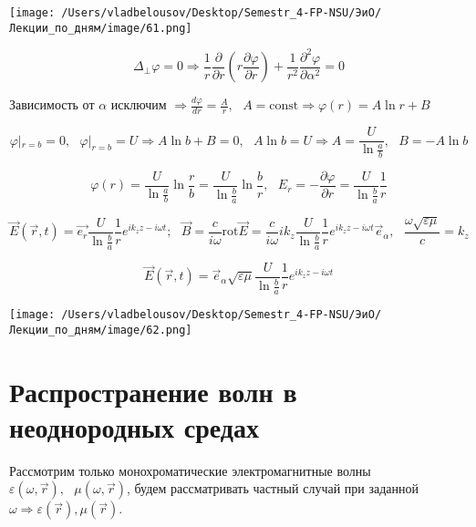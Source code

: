 \documentclass[12pt, a4paper]{report}
\begin{document}
\begin{center}
    \texttt{[image: /Users/vladbelousov/Desktop/Semestr\_4-FP-NSU/ЭиО/Лекции\_по\_дням/image/61.png]}
\end{center}

\[ \Delta _{ \perp  }\varphi = 0 \Rightarrow \frac{1}{r } \frac{\partial  }{\partial  r }\left(  r \frac{ \partial  \varphi }{\partial  r }  \right) + \frac{1}{r ^2 } \frac{\partial  ^2 \varphi }{\partial  \alpha ^2 }  =0   \] 

Зависимость от \( \alpha \) исключим \( \displaystyle \Rightarrow \frac{d \varphi }{dr  } =\frac{A }{r} , \text{ } A = \mathrm{const} \Rightarrow \varphi (r ) = A \ln r + B   \) 

\[ \varphi|_{r = b} =  0 ,\text{ } \varphi |_{r = b} =U \Rightarrow A \ln  b + B = 0 , \text{ } A \ln b = U \Rightarrow A = \frac{U }{\ln  \frac{a}{b} } , \text{ } B = -A \ln b   \] 

\[ \varphi(r ) = \frac{U }{\ln \frac{a}{b } } \ln \frac{r}{b }  = \frac{U }{\ln \frac{b}{a} } \ln \frac{b}{r}  , \text{ }  E_{r }  = - \frac{\partial  \varphi }{\partial  r } = \frac{U }{\ln \frac{b}{a} } \frac{1}{r}    \] 

\[ \vec{E } (\vec{r } ,t ) = \vec{e_r } \frac{U }{\ln \frac{b}{a} } \frac{1}{r} e^{i k_z z - i\omega t } ; \text{ } \vec{B } = \frac{c}{i \omega} \mathrm{rot } \vec{E } = \frac{c}{i \omega } i k_z  \frac{U }{\ln \frac{b}{a} } \frac{1}{r} e^{i k_z z - i \omega t }\vec{e } _{\alpha}   , \text{ } \frac{ \omega \sqrt{\varepsilon \mu } }{c } = k_z         \] 

\[ \vec{E } (\vec{r } ,t ) = \vec{e } _{\alpha } \sqrt{ \varepsilon \mu }  \frac{U }{\ln \frac{b}{a} } \frac{1}{r} e^{i k_z z - i \omega t }   \] 

\begin{center}
    \texttt{[image: /Users/vladbelousov/Desktop/Semestr\_4-FP-NSU/ЭиО/Лекции\_по\_дням/image/62.png]}
\end{center}

\section{Распространение волн в неоднородных средах}

Рассмотрим только монохроматические электромагнитные волны \( \varepsilon ( \omega , \vec{r } ) , \text{ }  \mu (\omega ,\vec{r} ) \), будем рассматривать частный случай при заданной \( \omega \Rightarrow \varepsilon (\vec{r } ), \mu ( \vec{r } ) \). 
\end{document}
